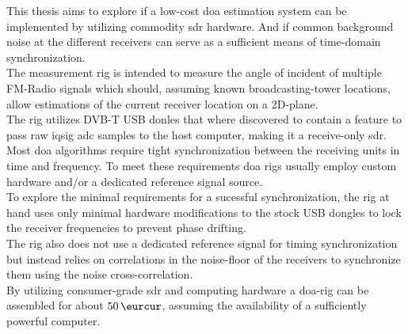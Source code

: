 This thesis aims to explore if a low-cost \gls{doa} estimation
system can be implemented by utilizing commodity \gls{sdr} hardware.
And if common background noise at the different receivers can serve
as a sufficient means of time-domain synchronization. \\

The measurement rig is intended to measure the angle of incident
of multiple FM-Radio signals which should, assuming known broadcasting-tower
locations, allow estimations of the current receiver location on
a 2D-plane. \\

The rig utilizes DVB-T USB donles that where discovered \cite{rtlhistory}
to contain a feature to pass raw \acrshort{iqsig} \acrshort{adc} samples
to the host computer, making it a receive-only \gls{sdr}. \\

Most \gls{doa} algorithms require tight synchronization between
the receiving units in time and frequency. To meet these requirements
\gls{doa} rigs usually employ custom hardware and/or a dedicated
reference signal source. \\

To explore the minimal requirements for a sucessful synchronization,
the rig at hand uses only minimal hardware modifications to
the stock USB dongles to lock the receiver
frequencies to prevent phase drifting. \\

The rig also does not use a dedicated reference signal
for timing synchronization but instead relies on correlations
in the noise-floor of the receivers to synchronize them
using the noise cross-correlation. \\

By utilizing consumer-grade \gls{sdr} and computing hardware
a \gls{doa}-rig can be assembled for about $\SI{50}{\eurcur}$,
assuming the availability of a sufficiently powerful computer.
